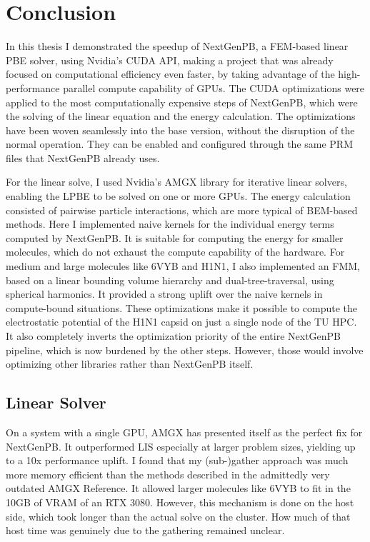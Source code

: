 \chapter{Conclusion}
\label{sec:conclusion}

In this thesis I demonstrated the speedup of NextGenPB, a FEM-based linear PBE solver, using Nvidia's CUDA API, making a project that was already focused on computational efficiency even faster, by taking advantage of the high-performance parallel compute capability of GPUs.
The CUDA optimizations were applied to the most computationally expensive steps of NextGenPB, which were the solving of the linear equation and the energy calculation.
The optimizations have been woven seamlessly into the base version, without the disruption of the normal operation.
They can be enabled and configured through the same PRM files that NextGenPB already uses.

For the linear solve, I used Nvidia's AMGX library for iterative linear solvers, enabling the LPBE to be solved on one or more GPUs.
The energy calculation consisted of pairwise particle interactions, which are more typical of BEM-based methods.
Here I implemented naive kernels for the individual energy terms computed by NextGenPB. 
It is suitable for computing the energy for smaller molecules, which do not exhaust the compute capability of the hardware.
For medium and large molecules like 6VYB and H1N1, I also implemented an FMM, based on a linear bounding volume hierarchy and dual-tree-traversal, using spherical harmonics.
It provided a strong uplift over the naive kernels in compute-bound situations.
These optimizations make it possible to compute the electrostatic potential of the H1N1 capsid on just a single node of the TU HPC.
It also completely inverts the optimization priority of the entire NextGenPB pipeline, which is now burdened by the other steps.
However, those would involve optimizing other libraries rather than NextGenPB itself.

\section{Linear Solver}
\label{sec:conclusion-linear-solver}

On a system with a single GPU, AMGX has presented itself as the perfect fix for NextGenPB. 
It outperformed LIS especially at larger problem sizes, yielding up to a 10x performance uplift.
I found that my (sub-)gather approach was much more memory efficient than the methods described in the admittedly very outdated AMGX Reference.
It allowed larger molecules like 6VYB to fit in the 10GB of VRAM of an RTX 3080.
However, this mechanism is done on the host side, which took longer than the actual solve on the cluster.
How much of that host time was genuinely due to the gathering remained unclear.

